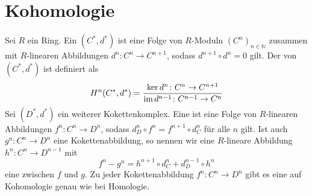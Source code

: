 
\newcommand{\fach}{Topologie \RM{2}.}
\newcommand{\semester}{WiSe 2015}
\newcommand{\homepage}{https://wwwmath.uni-muenster.de/das/ist/kein/echter/Link.html}

\newcommand{\prof}{Prof.\ Dr.\ Arthur Bartels}



\maketitle
\begin{abstract}

\end{abstract}

\tableofcontents
\cleardoubleoddemptypage

\setcounter{page}{1}
\setcounter{footnote}{0}

\section{Kohomologie} %
\label{sec:1}

\begin{definition}[{name=[Kokettenkomplex und Kohomologie]}]
	Sei $R$ ein Ring. Ein  $(C^*,d^*)$ ist eine Folge von $R$-Moduln $(C^n)_{n \in \mathbb{N}}$ zusammen mit $R$-linearen Abbildungen 
	$d^n \colon C^n \to C^{n+1}$, sodass $d^{n+1} \circ d^n =0$ gilt. Der  von $(C^*,d^*)$ ist definiert als 
	\[
		H^n(C^*,d^*) = \frac{\ker d^n \colon C^n \to C^{n+1}}{\operatorname{im} d^{n-1} \colon C^{n-1} \to C^n} 
	\]
	Sei $(D^*,d^{*})$ ein weiterer Kokettenkomplex.
	Eine  ist eine Folge von $R$-linearen Abbildungen $f^n\colon C^n\to D^n$, sodass $ d^n_D \circ f^n = f^{n+1}\circ d^n_C$ für alle $n$ gilt. Ist 
	auch $g^n \colon C^n \to D^n$ eine Kokettenabbildung, so nennen wir eine $R$-lineare Abbildung $h^n \colon C^n \to D^{n-1}$ mit
	\[
		f^n - g^n  = h^{n+1} \circ d_C^n + d_D^{n-1} \circ h^n 
	\]
	eine  zwischen $f$ und $g$. Zu jeder Kokettenabbildung $f^n\colon C^n\to D^n$ gibt es eine 
	 auf Kohomologie genau wie bei Homologie.
	
\end{definition}

